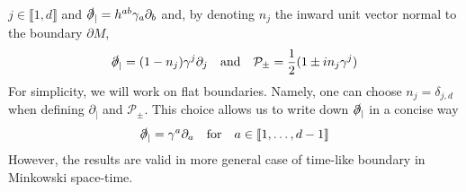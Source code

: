 $j \in \llbracket 1 , d \rrbracket$ and $\slashed{\partial}_| = h^{ab} \gamma_{a} \partial_{b}$ and, by denoting $n_j$ the inward unit vector normal to the boundary $\partial M$,
\begin{equation*}
\slashed{\partial}_| = (1 - n_j)\gamma^j\partial_j \quad\mathrm{and}\quad
\mathcal{P}_\pm = \frac 1 2 (1\pm i n_j\gamma^j)
\end{equation*}
For simplicity, we will work on flat boundaries.
Namely, one can choose $n_j = \delta_{j,d}$ when defining $\partial_|$ and $\mathcal P _\pm$.
This choice allows us to write down $\slashed{\partial}_|$ in a concise way
\begin{equation*}
\slashed \partial_| = \gamma^a\partial_a \quad\mathrm{for}\quad 
a \in \llbracket 1, \ldots, d-1 \rrbracket
\end{equation*}
However, the results are valid in more general case of time-like boundary in Minkowski space-time.





